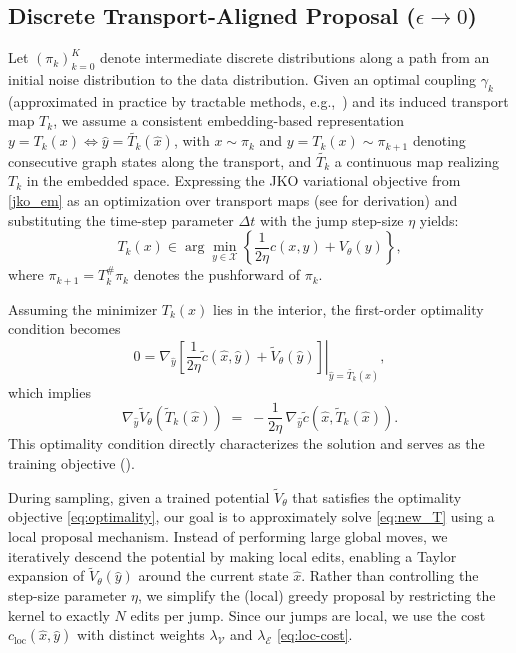 


\subsection{Discrete Transport-Aligned Proposal ($\epsilon\to 0$)}
\label{proposals}Let $(\pi_k)_{k=0}^{K}$ denote intermediate discrete distributions along a path from an initial noise distribution to the data distribution.
Given an optimal coupling $\gamma_k$ (approximated in practice by tractable methods, e.g.,~\cite{albergo2024stochastic,tong2024improving}) and its induced transport map $T_k$, we assume a consistent embedding-based representation $y = T_k(x) \iff \hat{y} = \tilde{T_k}(\hat{x})$, with $x \sim \pi_k$ and $y = T_k(x) \sim \pi_{k+1}$ denoting consecutive graph states along the transport, and $\tilde{T_k}$ a continuous map realizing $T_k$ in the embedded space.
Expressing the JKO variational objective from \eqref{jko_em} as an optimization over transport maps (see  for derivation) and substituting the time-step parameter $\Delta t$ with the jump step-size $\eta$ yields:
\begin{equation}
\label{eq:new_T}
    T_k(x)\in\arg\min_{y\in\mathcal{X}}\left\{\frac{1}{2\eta}c(x,y)+V_\theta(y)\right\},
\end{equation}
where $\pi_{k+1}=T^\#_{k}\pi_k$ denotes the pushforward of $\pi_k$.

Assuming the minimizer $T_k(x)$ lies in the interior, the first-order optimality condition becomes
\begin{equation}
0 = \left.\nabla_{\hat{y}}\left[\frac{1}{2\eta}\tilde{c}(\hat{x},\hat{y})+\tilde{V}_\theta(\hat{y})\right]\right|_{\hat{y}=\tilde{T_k}(\hat{x})},
\end{equation}
which implies
\begin{equation}
\label{eq:optimality}
\nabla_{\hat{y}}\tilde V_\theta\!\left(\tilde T_k(\hat{x})\right)
\;=\;
-\frac{1}{2\eta}\,
\nabla_{\hat{y}}\tilde c\!\left(\hat{x},\tilde T_k(\hat{x})\right).
\end{equation}
This optimality condition directly characterizes the solution and serves as the training objective ().


 During sampling, given a trained potential $\tilde V_\theta$ that satisfies the optimality objective \eqref{eq:optimality}, our goal is to approximately solve \eqref{eq:new_T} using a local proposal mechanism. Instead of performing large global moves, we iteratively descend the potential by making local edits, enabling a Taylor expansion of $\tilde V_\theta(\hat y)$ around the current state $\hat x$. Rather than controlling the step-size parameter $\eta$, we simplify the (local) greedy proposal by restricting the kernel to exactly $N$ edits per jump. Since our jumps are local, we use the cost \( c_{\mathrm{loc}}(\hat x,\hat y) \) with distinct weights \(\lambda_\mathcal{V}\) and \(\lambda_\mathcal{E}\) \eqref{eq:loc-cost}.

